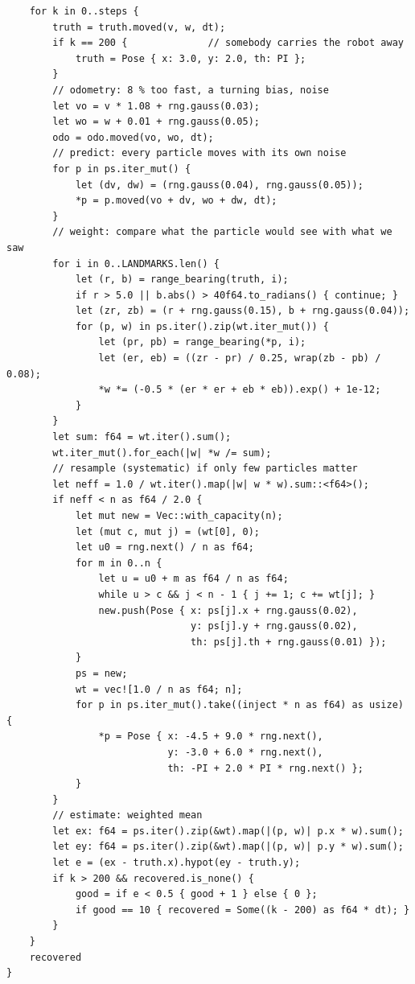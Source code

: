 \begin{enumerate}[label=\textbf{\ansnum.\arabic*}]
\begin{verbatim}
    for k in 0..steps {
        truth = truth.moved(v, w, dt);
        if k == 200 {              // somebody carries the robot away
            truth = Pose { x: 3.0, y: 2.0, th: PI };
        }
        // odometry: 8 % too fast, a turning bias, noise
        let vo = v * 1.08 + rng.gauss(0.03);
        let wo = w + 0.01 + rng.gauss(0.05);
        odo = odo.moved(vo, wo, dt);
        // predict: every particle moves with its own noise
        for p in ps.iter_mut() {
            let (dv, dw) = (rng.gauss(0.04), rng.gauss(0.05));
            *p = p.moved(vo + dv, wo + dw, dt);
        }
        // weight: compare what the particle would see with what we saw
        for i in 0..LANDMARKS.len() {
            let (r, b) = range_bearing(truth, i);
            if r > 5.0 || b.abs() > 40f64.to_radians() { continue; }
            let (zr, zb) = (r + rng.gauss(0.15), b + rng.gauss(0.04));
            for (p, w) in ps.iter().zip(wt.iter_mut()) {
                let (pr, pb) = range_bearing(*p, i);
                let (er, eb) = ((zr - pr) / 0.25, wrap(zb - pb) / 0.08);
                *w *= (-0.5 * (er * er + eb * eb)).exp() + 1e-12;
            }
        }
        let sum: f64 = wt.iter().sum();
        wt.iter_mut().for_each(|w| *w /= sum);
        // resample (systematic) if only few particles matter
        let neff = 1.0 / wt.iter().map(|w| w * w).sum::<f64>();
        if neff < n as f64 / 2.0 {
            let mut new = Vec::with_capacity(n);
            let (mut c, mut j) = (wt[0], 0);
            let u0 = rng.next() / n as f64;
            for m in 0..n {
                let u = u0 + m as f64 / n as f64;
                while u > c && j < n - 1 { j += 1; c += wt[j]; }
                new.push(Pose { x: ps[j].x + rng.gauss(0.02),
                                y: ps[j].y + rng.gauss(0.02),
                                th: ps[j].th + rng.gauss(0.01) });
            }
            ps = new;
            wt = vec![1.0 / n as f64; n];
            for p in ps.iter_mut().take((inject * n as f64) as usize) {
                *p = Pose { x: -4.5 + 9.0 * rng.next(),
                            y: -3.0 + 6.0 * rng.next(),
                            th: -PI + 2.0 * PI * rng.next() };
            }
        }
        // estimate: weighted mean
        let ex: f64 = ps.iter().zip(&wt).map(|(p, w)| p.x * w).sum();
        let ey: f64 = ps.iter().zip(&wt).map(|(p, w)| p.y * w).sum();
        let e = (ex - truth.x).hypot(ey - truth.y);
        if k > 200 && recovered.is_none() {
            good = if e < 0.5 { good + 1 } else { 0 };
            if good == 10 { recovered = Some((k - 200) as f64 * dt); }
        }
    }
    recovered
}


\end{verbatim}
\end{enumerate}
